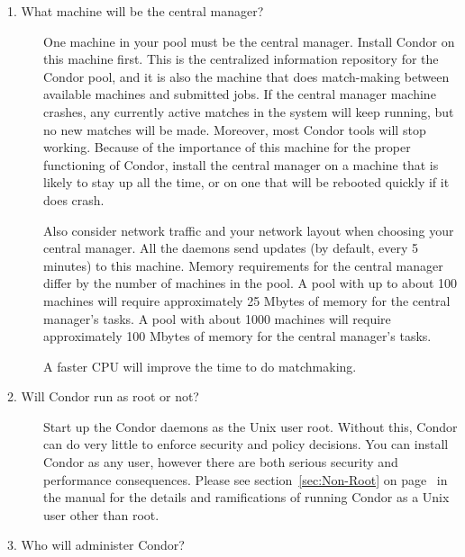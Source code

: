 \begin{description}

\item[1. What machine will be the central manager?]

One machine in your pool must be the central manager.
Install Condor on this machine first.
This is the centralized information repository for the Condor pool,
and it is also the
machine that does match-making between available machines and
submitted jobs.
If the central manager machine crashes, any currently active
matches in the system will keep running, but no new matches will be
made.  Moreover, most Condor tools will stop working.  Because of the
importance of this machine for the proper functioning of Condor,
install the central manager on a machine that is likely to stay up all the
time, or on one that will be rebooted quickly if it does crash.

Also consider
network traffic and your network layout when choosing your central
manager.
All the daemons send updates (by default, every 5 minutes) to this machine.
Memory requirements for the central manager differ by the number of machines
in the pool.
A pool with up to about 100 machines will require approximately
25 Mbytes of memory for the central manager's tasks.
A pool with about 1000 machines will require approximately
100 Mbytes of memory for the central manager's tasks.

A faster CPU will improve the time to do matchmaking. 

\item[2. Will Condor run as root or not?]

Start up the Condor daemons as the Unix user root.
Without this,
Condor can do very little to enforce security and policy
decisions.
You can install Condor as any user,
however there are both serious security and performance consequences.
Please see section~\ref{sec:Non-Root} on page~\pageref{sec:Non-Root}
in the manual for the details and ramifications of
running Condor as a Unix user other than root.

\item[3. Who will administer Condor?]




\end{description}
